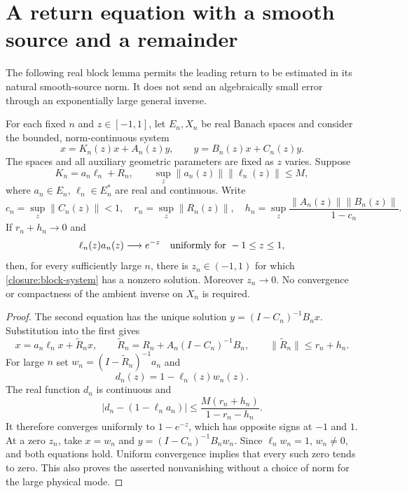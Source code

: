 \section{A return equation with a smooth source and a remainder}

The following real block lemma permits the leading return to be estimated
in its natural smooth-source norm. It does not send an algebraically
small error through an exponentially large general inverse.

\begin{lemma}\label{closure:mixed-return}
For each fixed $n$ and $z\in[-1,1]$, let $E_n,X_n$ be real Banach
spaces and consider the bounded, norm-continuous system
\begin{equation}\label{closure:block-system}
 x=K_n(z)x+A_n(z)y,\qquad
 y=B_n(z)x+C_n(z)y.
\end{equation}
The spaces and all auxiliary geometric parameters are fixed as $z$
varies. Suppose
\[
 K_n=a_n\ell_n+R_n,\qquad
 \sup_z\|a_n(z)\|\|\ell_n(z)\|\le M,
\]
where $a_n\in E_n$, $\ell_n\in E_n^*$ are real and continuous.
Write
\[
 c_n=\sup_z\|C_n(z)\|<1,\quad
 r_n=\sup_z\|R_n(z)\|,
 \quad
 h_n=\sup_z\frac{\|A_n(z)\|\|B_n(z)\|}{1-c_n}.
\]
If $r_n+h_n\to0$ and
\[
 \ell_n(z)a_n(z)\longrightarrow e^{-z}
 \quad\hbox{uniformly for }-1\le z\le1,
\]
then, for every sufficiently large $n$, there is $z_n\in(-1,1)$
for which \eqref{closure:block-system} has a nonzero solution.
Moreover $z_n\to0$. No convergence or compactness of the ambient
inverse on $X_n$ is required.
\end{lemma}

\begin{proof}
The second equation has the unique solution
$y=(I-C_n)^{-1}B_nx$. Substitution into the first gives
\[
 x=a_n\ell_nx+\widetilde R_nx,
 \qquad
 \widetilde R_n=R_n+A_n(I-C_n)^{-1}B_n,
 \qquad \|\widetilde R_n\|\le r_n+h_n.
\]
For large $n$ set $w_n=(I-\widetilde R_n)^{-1}a_n$ and
\[
 d_n(z)=1-\ell_n(z)w_n(z).
\]
The real function $d_n$ is continuous and
\[
 |d_n-(1-\ell_na_n)|
 \le \frac{M(r_n+h_n)}{1-r_n-h_n}.
\]
It therefore converges uniformly to $1-e^{-z}$, which has opposite
signs at $-1$ and $1$. At a zero $z_n$, take
$x=w_n$ and $y=(I-C_n)^{-1}B_nw_n$. Since $\ell_nw_n=1$,
$w_n\ne0$, and both equations hold. Uniform convergence implies
that every such zero tends to zero. This also proves the asserted
nonvanishing without a choice of norm for the large physical mode.
\end{proof}
